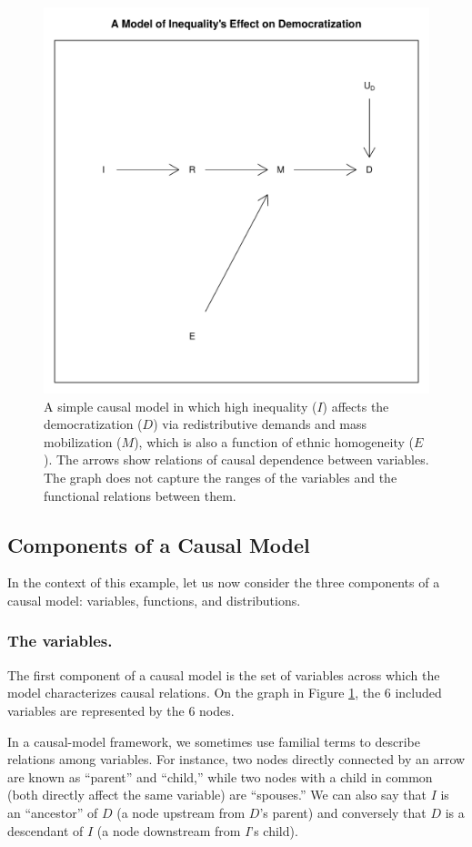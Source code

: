\documentclass[
  12pt,
]{book}
\begin{document}
\begin{figure}

{\centering \includegraphics[width=.5\textwidth]{ii_files/figure-latex/simpleDAG-1} 

}

\caption{A simple causal model in which high inequality ($I$) affects the democratization ($D$) via redistributive demands and mass mobilization ($M$), which is also a function of ethnic homogeneity ($E$). The arrows show relations of causal dependence between variables.  The graph does not capture the ranges of the variables and the functional relations between them.}\label{fig:simpleDAG}
\end{figure}

\hypertarget{components-of-a-causal-model}{%
\subsection{Components of a Causal Model}\label{components-of-a-causal-model}}

In the context of this example, let us now consider the three components of a causal model: variables, functions, and distributions.

\hypertarget{the-variables.}{%
\subsubsection{The variables.}\label{the-variables.}}

The first component of a causal model is the set of variables across which the model characterizes causal relations. On the graph in Figure \ref{fig:simpleDAG}, the 6 included variables are represented by the 6 nodes.

In a causal-model framework, we sometimes use familial terms to describe relations among variables. For instance, two nodes directly connected by an arrow are known as ``parent'' and ``child,'' while two nodes with a child in common (both directly affect the same variable) are ``spouses.'' We can also say that \(I\) is an ``ancestor'' of \(D\) (a node upstream from \(D\)'s parent) and conversely that \(D\) is a descendant of \(I\) (a node downstream from \(I\)'s child).
\end{document}
